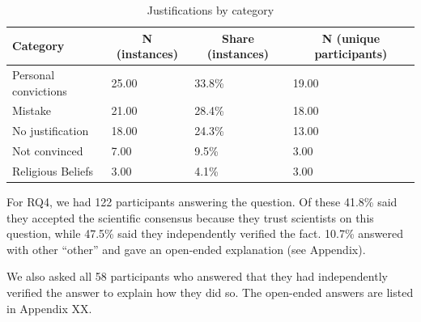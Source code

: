 \documentclass[
  doc,floatsintext]{apa6}
\begin{document}
\begin{table}[tbp]

\begin{center}
\begin{threeparttable}

\caption{\label{tab:exp3-justifications}Justifications by category}

\begin{tabular}{llll}
\toprule
Category & \multicolumn{1}{c}{N (instances)} & \multicolumn{1}{c}{Share (instances)} & \multicolumn{1}{c}{N (unique participants)}\\
\midrule
Personal convictions & 25.00 & 33.8\% & 19.00\\
Mistake & 21.00 & 28.4\% & 18.00\\
No justification & 18.00 & 24.3\% & 13.00\\
Not convinced & 7.00 & 9.5\% & 3.00\\
Religious Beliefs & 3.00 & 4.1\% & 3.00\\
\bottomrule
\end{tabular}

\end{threeparttable}
\end{center}

\end{table}

For RQ4, we had 122 participants answering the question. Of these 41.8\% said they accepted the scientific consensus because they trust scientists on this question, while 47.5\% said they independently verified the fact. 10.7\% answered with other ``other'' and gave an open-ended explanation (see Appendix).

We also asked all 58 participants who answered that they had independently verified the answer to explain how they did so. The open-ended answers are listed in Appendix XX.
\end{document}
